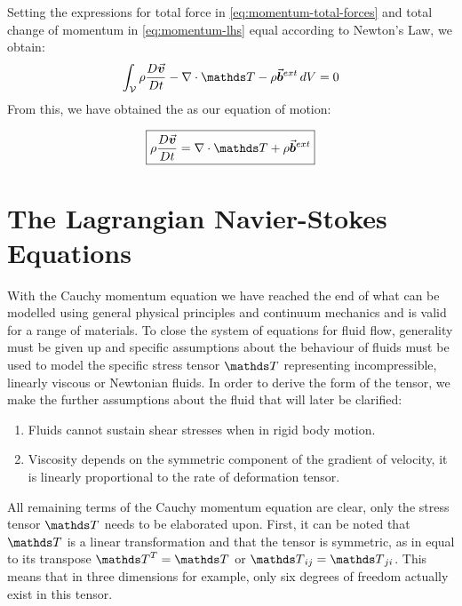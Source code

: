 Setting the expressions for total force in \autoref{eq:momentum-total-forces} and total change of momentum in \autoref{eq:momentum-lhs} equal according to Newton's Law, we obtain:
\begin{align}
    \int_\mathcal{V}  \rho\frac{D\vek{v}}{Dt} - \nabla\cdot\mat{T} - \rho\vek{b}^{ext} \,dV = 0
\end{align}
From this, we have obtained the  as our equation of motion\autocite*{tutorial}:

\begin{equation}\label{eq:cauchy-momentum-eq}
    \text{\fbox{$\rho\frac{D\vek{v}}{Dt} =  \nabla\cdot\mat{T} + \rho\vek{b}^{ext}$}}
\end{equation}

\section{The Lagrangian Navier-Stokes Equations}
With the Cauchy momentum equation we have reached the end of what can be modelled using general physical principles and continuum mechanics and is valid for a range of materials. To close the system of equations for fluid flow, generality must be given up and specific assumptions about the behaviour of fluids must be used to model the specific stress tensor $\mat{T}$ representing incompressible, linearly viscous or Newtonian fluids. In order to derive the form of the tensor, we make the further assumptions about the fluid that will later be clarified:
\begin{enumerate}
    \item Fluids cannot sustain shear stresses when in rigid body motion.\label{enum:ns-fluid-cant-sustain-shear}
    \item Viscosity depends on the symmetric component of the gradient of velocity, it is linearly proportional to the rate of deformation tensor.\label{enum:ns-vis-prop-rate-of-deform}
\end{enumerate}


All remaining terms of the Cauchy momentum equation are clear, only the stress tensor $\mat{T}$ needs to be elaborated upon. First, it can be noted that $\mat{T}$ is a linear transformation\autocite*{continuum-intro} and that the tensor is symmetric\autocite*{continuum-intro}, as in equal to its transpose $\mat{T}^T = \mat{T}$ or $\mat{T}_{ij} = \mat{T}_{ji}$. This means that in three dimensions for example, only six degrees of freedom actually exist in this tensor\autocite*{incompressible-flow-volker}.

